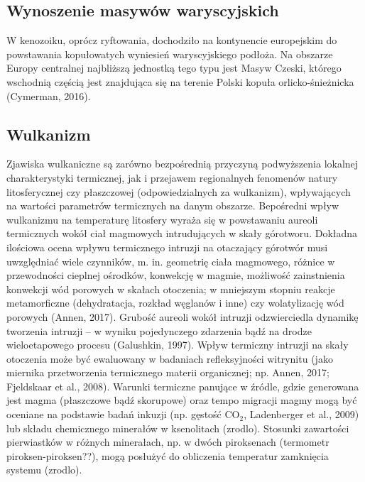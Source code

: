 \documentclass[11.5pt,twoside]{report}
\begin{document}
	\subsection{Wynoszenie masywów waryscyjskich}
	
W kenozoiku, oprócz ryftowania, dochodziło na kontynencie europejskim do powstawania kopułowatych wyniesień waryscyjskiego podłoża. Na obszarze Europy centralnej najbliższą jednostką tego typu jest Masyw Czeski, którego wschodnią częścią jest znajdująca się na terenie Polski kopuła orlicko-śnieżnicka (Cymerman, 2016). 

	
	\subsection{Wulkanizm}
	
Zjawiska wulkaniczne są zarówno bezpośrednią przyczyną podwyższenia lokalnej charakterystyki termicznej, jak i przejawem regionalnych fenomenów natury litosferycznej czy płaszczowej (odpowiedzialnych za wulkanizm), wpływających na wartości parametrów termicznych na danym obszarze. Bepośredni wpływ wulkanizmu na temperaturę litosfery wyraża się w powstawaniu aureoli termicznych wokół ciał magmowych intrudujących w skały górotworu. Dokładna ilościowa ocena wpływu termicznego intruzji na otaczający górotwór musi uwzględniać wiele czynników, m. in. geometrię ciała magmowego, różnice w przewodności cieplnej ośrodków, konwekcję w magmie, możliwość zainstnienia konwekcji wód porowych w skałach otoczenia; w mniejszym stopniu reakcje metamorficzne (dehydratacja, rozkład węglanów i inne) czy wolatylizację wód porowych (Annen, 2017). Grubość aureoli wokół intruzji odzwierciedla dynamikę tworzenia intruzji -- w wyniku pojedynczego zdarzenia bąd\'{z} na drodze wieloetapowego procesu (Galushkin, 1997). Wpływ termiczny intruzji na skały otoczenia może być ewaluowany w badaniach refleksyjności witrynitu (jako miernika przetworzenia termicznego materii organicznej; np. Annen, 2017; Fjeldskaar et al., 2008). Warunki termiczne panujące w \'{z}ródle, gdzie generowana jest magma (płaszczowe bąd\'{z} skorupowe) oraz tempo migracji magmy mogą być oceniane na podstawie badań inkuzji (np. gęstość CO$_{2}$, Ladenberger et al., 2009) lub składu chemicznego minerałów w ksenolitach (zrodlo). Stosunki zawartości pierwiastków w różnych minerałach, np. w dwóch piroksenach (termometr piroksen-piroksen??), mogą posłużyć do obliczenia temperatur zamknięcia systemu (zrodlo).
\end{document}
